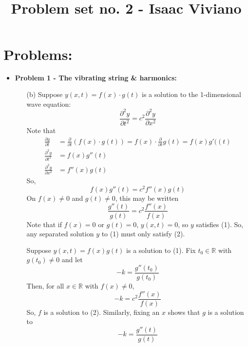\documentclass[12pt, reqno]{amsart}
\theoremstyle{definition}
\theoremstyle{remark}
\begin{document}
\title[Math 357 - Harmonic Analysis]{Problem set no. 2 - Isaac Viviano}


\maketitle

\newpage
\null
\newpage

\section{Problems:} 

\begin{itemize}

\item {\bf{Problem 1 - The vibrating string \& harmonics:}} 

\vspace{0.1 cm}
\begin{itemize}
\item[(b)]
    Suppose $y(x,t)=f(x)\cdot g(t)$ is a solution to the 1-dimensional wave equation: \begin{equation}\frac{\partial ^{2}y}{\partial t^{2}}=c^{2} \frac{\partial ^{2}y}{\partial x^{2}}\end{equation}Note that \begin{align*}
        \frac{\partial y}{\partial t}&= \frac{\partial }{\partial t}(f(x)\cdot g(t))=f(x)\cdot\frac{\partial }{\partial t}g(t)=f(x)g'((t)\\
        \frac{\partial ^{2}y}{\partial t^{2}}&= f(x)g''(t)\\
        \frac{\partial ^{2}y}{\partial x^{2}}&= f''(x)g(t)
        \end{align*}
        So, $$f(x)g''(t)=c^{2}f''(x)g(t)$$On $f(x)\ne0$ and $g(t)\ne 0$, this may be written \begin{equation}\frac{g''(t)}{g(t)}=c^{2}\frac{f''(x)}{f(x)}\end{equation}Note that if $f(x)=0$ or $g(t)=0$, $y(x,t)=0$, so $y$ satisfies (1). So, any separated solution $y$ to (1) must only satisfy (2).
        
        Suppose $y(x,t)=f(x)g(t)$ is a solution to (1). Fix $t_{0}\in \mathbb{R}$ with $g(t_{0})\ne0$ and let $$-k= \frac{g''(t_{0})}{g(t_{0})}$$Then, for all $x\in \mathbb{R}$ with $f(x)\ne0$, \begin{equation}-k=c^{2} \frac{f''(x)}{f(x)}\end{equation}So, $f$ is a solution to (2). Similarly, fixing an $x$ shows that $g$ is a solution to \begin{equation}-k= \frac{g''(t)}{g(t)}\end{equation}
\vspace{0.1 cm}


\end{itemize}
\end{itemize}
\end{document}

